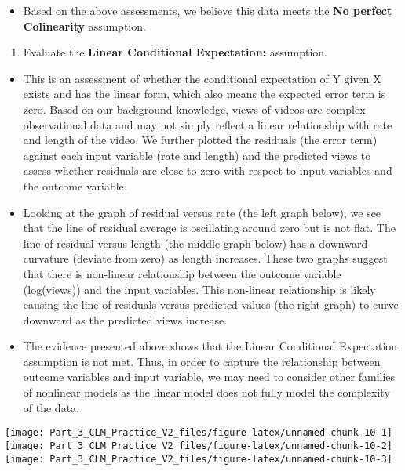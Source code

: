 \documentclass[
]{article}
\providecommand{\tightlist}{%
  \setlength{\itemsep}{0pt}\setlength{\parskip}{0pt}}
\begin{document}
\begin{itemize}
\tightlist
\item
  Based on the above assessments, we believe this data meets the
  \textbf{No perfect Colinearity} assumption.
\end{itemize}

\begin{enumerate}
\def\labelenumi{\arabic{enumi}.}
\setcounter{enumi}{2}
\tightlist
\item
  Evaluate the \textbf{Linear Conditional Expectation:} assumption.
\end{enumerate}

\begin{itemize}
\item
  This is an assessment of whether the conditional expectation of Y
  given X exists and has the linear form, which also means the expected
  error term is zero. Based on our background knowledge, views of videos
  are complex observational data and may not simply reflect a linear
  relationship with rate and length of the video. We further plotted the
  residuals (the error term) against each input variable (rate and
  length) and the predicted views to assess whether residuals are close
  to zero with respect to input variables and the outcome variable.
\item
  Looking at the graph of residual versus rate (the left graph below),
  we see that the line of residual average is oscillating around zero
  but is not flat. The line of residual versus length (the middle graph
  below) has a downward curvature (deviate from zero) as length
  increases. These two graphs suggest that there is non-linear
  relationship between the outcome variable (log(views)) and the input
  variables. This non-linear relationship is likely causing the line of
  residuals versus predicted values (the right graph) to curve downward
  as the predicted views increase.
\item
  The evidence presented above shows that the Linear Conditional
  Expectation assumption is not met. Thus, in order to capture the
  relationship between outcome variables and input variable, we may need
  to consider other families of nonlinear models as the linear model
  does not fully model the complexity of the data.
\end{itemize}

\texttt{[image: Part\_3\_CLM\_Practice\_V2\_files/figure-latex/unnamed-chunk-10-1]}
\texttt{[image: Part\_3\_CLM\_Practice\_V2\_files/figure-latex/unnamed-chunk-10-2]}
\texttt{[image: Part\_3\_CLM\_Practice\_V2\_files/figure-latex/unnamed-chunk-10-3]}
\end{document}
